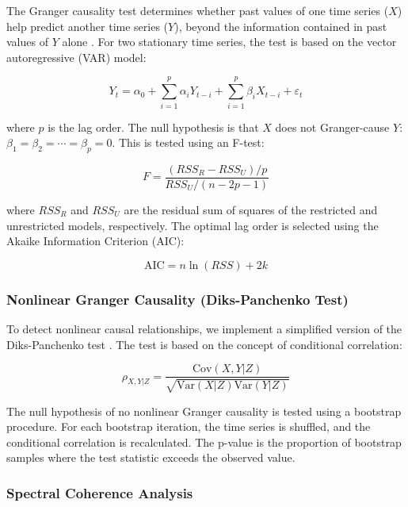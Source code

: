 \documentclass[12pt,a4paper,twocolumn]{article}
\begin{document}
The Granger causality test determines whether past values of one time series ($X$) help predict another time series ($Y$), beyond the information contained in past values of $Y$ alone \citep{granger1969}. For two stationary time series, the test is based on the vector autoregressive (VAR) model:

\begin{equation}
Y_t = \alpha_0 + \sum_{i=1}^{p} \alpha_i Y_{t-i} + \sum_{i=1}^{p} \beta_i X_{t-i} + \varepsilon_t
\end{equation}

where $p$ is the lag order. The null hypothesis is that $X$ does not Granger-cause $Y$: $\beta_1 = \beta_2 = \cdots = \beta_p = 0$. This is tested using an F-test:

\begin{equation}
F = \frac{(RSS_R - RSS_U) / p}{RSS_U / (n - 2p - 1)}
\end{equation}

where $RSS_R$ and $RSS_U$ are the residual sum of squares of the restricted and unrestricted models, respectively. The optimal lag order is selected using the Akaike Information Criterion (AIC):

\begin{equation}
\text{AIC} = n \ln(RSS) + 2k
\end{equation}

\subsubsection{Nonlinear Granger Causality (Diks-Panchenko Test)}

To detect nonlinear causal relationships, we implement a simplified version of the Diks-Panchenko test \citep{diks2006}. The test is based on the concept of conditional correlation:

\begin{equation}
\rho_{X,Y|Z} = \frac{\text{Cov}(X, Y | Z)}{\sqrt{\text{Var}(X | Z) \text{Var}(Y | Z)}}
\end{equation}

The null hypothesis of no nonlinear Granger causality is tested using a bootstrap procedure. For each bootstrap iteration, the time series is shuffled, and the conditional correlation is recalculated. The p-value is the proportion of bootstrap samples where the test statistic exceeds the observed value.

\subsubsection{Spectral Coherence Analysis}
\end{document}
